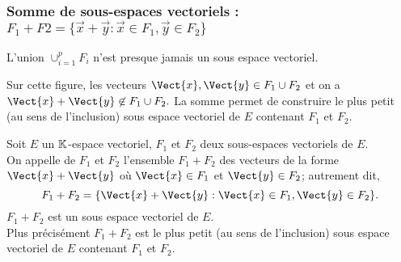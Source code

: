 \documentclass{book}
\begin{document}
\subsubsection{Somme de sous-espaces vectoriels : $F_1+F2=\{\vec{x}+\vec{y}:\vec{x} \in F_1,\vec{y} \in F_2  \}$ }
\begin{Remarque}
L'union $\cup_{i=1}^p F_i$ n'est presque jamais un sous espace vectoriel.

\begin{center}
\end{center}
Sur cette figure, les vecteurs $\Vect{x},\Vect{y}\in F_1\cup F_2$ et on a $\Vect{x}+\Vect{y}\not\in  F_1 \cup F_2.$ La somme permet de construire le plus petit (au sens de l'inclusion) sous espace vectoriel  de $E$ contenant $F_1$ et $F_2$.
\end{Remarque}
\begin{DefinitionProposition}[Somme]
Soit $E$ un $\mathbb{K} $-espace vectoriel, $F_1$ et $F_2$ deux sous-espaces vectoriels de $E$.\\
On appelle  de $F_1$ et $F_2$ l'ensemble $ F_1+F_2$ des vecteurs de la forme $\Vect{x} +\Vect{y}$
où $\Vect{x}\in F_1$ et $\Vect{y}\in F_2$;
autrement dit,
\[  F_1+F_2 = \{\Vect{x} +\Vect{y} : \Vect{x}\in F_1,\Vect{y}\in F_2\}. \]
$F_1+F_2$ est un sous espace vectoriel  de $E$.\\
Plus précisément $F_1+F_2$ est le plus petit (au sens de l'inclusion) sous espace vectoriel  de $E$ contenant $F_1$ et $F_2$.
\end{DefinitionProposition}
\end{document}
